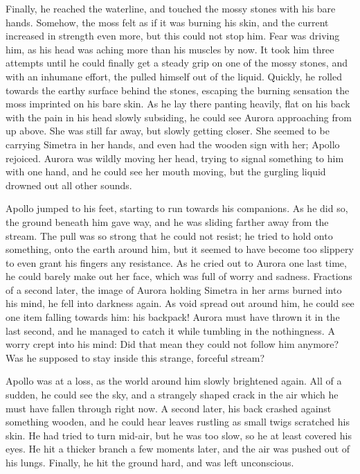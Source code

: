 Finally, he reached the waterline, and touched the mossy stones with his bare hands. Somehow, the moss felt as if it was burning his skin, and the current increased in strength even more, but this could not stop him. Fear was driving him, as his head was aching more than his muscles by now. It took him three attempts until he could finally get a steady grip on one of the mossy stones, and with an inhumane effort, the pulled himself out of the liquid. Quickly, he rolled towards the earthy surface behind the stones, escaping the burning sensation the moss imprinted on his bare skin. As he lay there panting heavily, flat on his back with the pain in his head slowly subsiding, he could see Aurora approaching from up above. She was still far away, but slowly getting closer. She seemed to be carrying Simetra in her hands, and even had the wooden sign with her; Apollo rejoiced. Aurora was wildly moving her head, trying to signal something to him with one hand, and he could see her mouth moving, but the gurgling liquid drowned out all other sounds.

Apollo jumped to his feet, starting to run towards his companions. As he did so, the ground beneath him gave way, and he was sliding farther away from the stream. The pull was so strong that he could not resist; he tried to hold onto something, onto the earth around him, but it seemed to have become too slippery to even grant his fingers any resistance. As he cried out to Aurora one last time, he could barely make out her face, which was full of worry and sadness. Fractions of a second later, the image of Aurora holding Simetra in her arms burned into his mind, he fell into darkness again. As void spread out around him, he could see one item falling towards him: his backpack! Aurora must have thrown it in the last second, and he managed to catch it while tumbling in the nothingness. A worry crept into his mind: Did that mean they could not follow him anymore? Was he supposed to stay inside this strange, forceful stream?

Apollo was at a loss, as the world around him slowly brightened again. All of a sudden, he could see the sky, and a strangely shaped crack in the air which he must have fallen through right now. A second later, his back crashed against something wooden, and he could hear leaves rustling as small twigs scratched his skin. He had tried to turn mid-air, but he was too slow, so he at least covered his eyes. He hit a thicker branch a few moments later, and the air was pushed out of his lungs. Finally, he hit the ground hard, and was left unconscious.
